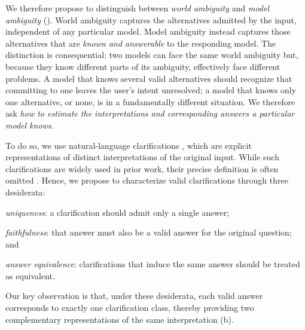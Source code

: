  We therefore propose to distinguish between \emph{world ambiguity} and \emph{model ambiguity} (). World ambiguity captures the alternatives admitted by the input, independent of any particular model. Model ambiguity instead captures those alternatives that are \emph{known and answerable} to the responding model. The distinction is consequential: two models can face the same world ambiguity but, because they know different parts of its ambiguity, effectively face different problems. A model that knows several valid alternatives should recognize that committing to one leaves the user's intent unresolved; a model that knows only one alternative, or none, is in a fundamentally different situation. We therefore ask  \emph{how to estimate the interpretations and corresponding answers a particular model knows}.

To do so, we use natural-language clarifications \citep{min-etal-2020-ambigqa,kim-etal-2023-tree}, which are explicit representations of distinct interpretations of the original input. While such clarifications are widely used in prior work, their precise definition is often omitted \citep{pmlr-v235-hou24b,epub135635,rosseeuw2025clara}. Hence, we propose to characterize valid clarifications through three desiderata:
\begin{inparaenum}[(i)]
    \item \emph{uniqueness}: a clarification should admit only a single answer;
    \item \emph{faithfulness}: that answer must also be a valid answer for the original question; and
    \item \emph{answer equivalence}: clarifications that induce the same answer should be treated as equivalent.
\end{inparaenum}
Our key observation is that, under these desiderata, each valid answer corresponds to exactly one clarification class, thereby providing two complementary representations of the same interpretation (b). 

